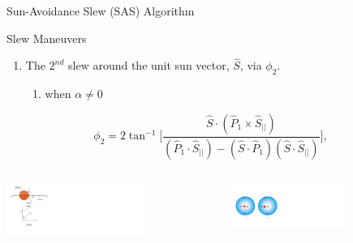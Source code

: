 \documentclass{beamer}
\begin{document}
%
\begin{frame}{Sun-Avoidance Slew (SAS) Algorithm}
\begin{block}{Slew Maneuvers}
\begin{enumerate}[2]
\item The $2^{nd}$ slew around the unit sun vector, $\hat{S}$, via $\phi_2$.
\begin{enumerate}[a]
\item when $\alpha\neq0$
\end{enumerate}
\end{enumerate}
\begin{equation}
\phi_2=2\tan^{-1}\Big[ \frac{\hat{S}\cdot (\hat{P}_1\times\hat{S}_{||})}{(\hat{P}_1\cdot\hat{S}_{||})-(\hat{S}\cdot\hat{P}_1)(\hat{S}\cdot\hat{S}_{||})}\Big],
\end{equation}


\begin{columns}
	\begin{column}{0.5\textwidth}
		\begin{center}
			\includegraphics[width=1.75in]{./Figures/SVAS_2r_modified}
		\end{center}
	\end{column}
	\begin{column}{0.5\textwidth}  %
		\begin{center}
			\includegraphics[width=1.5in]{./Figures/SASSchematic4}
		\end{center}
	\end{column}
\end{columns}



\end{block}
\end{frame}
\end{document}
